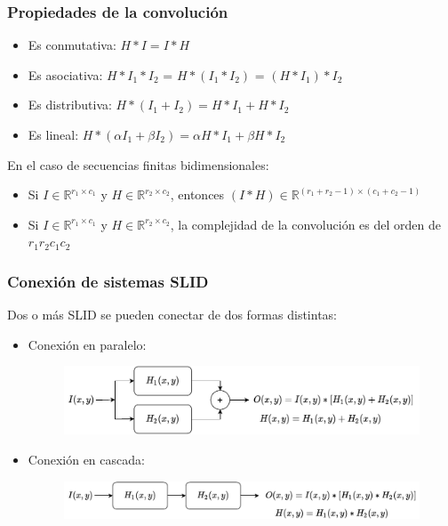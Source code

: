 \begin{frame}\frametitle{Propiedades de la convolución}
  \begin{itemize}
  \item Es conmutativa: $H*I = I*H$
  \item Es asociativa: $H*I_1*I_2$ = $H*(I_1*I_2)$ = $(H*I_1)*I_2$
  \item Es distributiva: $H*(I_1 + I_2) = H*I_1 + H*I_2$
  \item Es lineal: $H*(\alpha I_1 + \beta I_2) = \alpha H*I_1 + \beta H*I_2$
  \end{itemize}
  En el caso de secuencias finitas bidimensionales:
  \begin{itemize}
  \item Si $I\in\mathbb{R}^{r_1\times c_1}$ y $H\in\mathbb{R}^{r_2\times c_2}$, entonces $(I*H) \in \mathbb{R}^{(r_1+r_2-1)\times (c_1 + c_2 - 1)}$
  \item Si $I\in\mathbb{R}^{r_1\times c_1}$ y $H\in\mathbb{R}^{r_2\times c_2}$, la complejidad de la convolución es del orden de $r_1 r_2 c_1 c_2$
  \end{itemize}
\end{frame}

\begin{frame}\frametitle{Conexión de sistemas SLID}
  Dos o más SLID se pueden conectar de dos formas distintas:
  \begin{itemize}
  \item Conexión en paralelo:
    \begin{figure}
      \centering
      \includegraphics[scale=0.7]{Figures/Parallel.pdf}
    \end{figure}
  \item Conexión en cascada:
    \begin{figure}
      \centering
      \includegraphics[scale=0.7]{Figures/Cascade.pdf}
    \end{figure}
  \end{itemize}
\end{frame}

